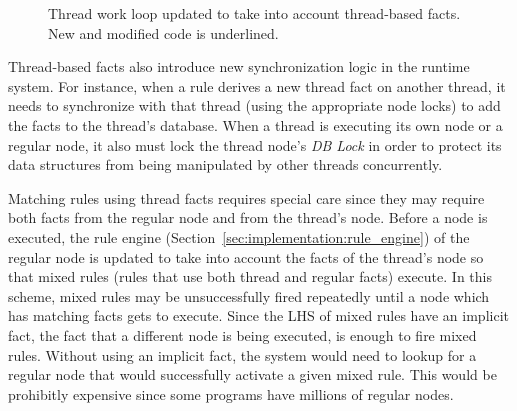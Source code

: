 \begin{figure}
\begin{algorithm}[H]
\end{algorithm}
\caption{Thread work loop updated to take into account thread-based facts.
New and modified code is underlined.}
\label{alg:threads:work_loop}
\end{figure}

Thread-based facts also introduce new synchronization logic in the runtime
system. For instance, when a rule derives a new thread fact on another thread,
it needs to synchronize with that thread (using the appropriate node locks) to
add the facts to the thread's database. When a thread is executing its own node
or a regular node, it also must lock the thread node's \emph{DB Lock} in order
to protect its data structures from being manipulated by other threads
concurrently.

Matching rules using thread facts requires special care since they may require
both facts from the regular node and from the thread's node. Before a node is
executed, the rule engine (Section~\ref{sec:implementation:rule_engine}) of the
regular node is updated to take into account the facts of the thread's node so
that mixed rules (rules that use both thread and regular facts) execute. In this
scheme, mixed rules may be unsuccessfully fired repeatedly until a node which
has matching facts gets to execute.  Since the LHS of mixed rules have an
implicit  fact, the fact that a different node is being
executed, is enough to fire mixed rules. Without using an implicit
 fact, the system would need to lookup for a regular node that
would successfully activate a given mixed rule. This would be prohibitly
expensive since some programs have millions of regular nodes.
